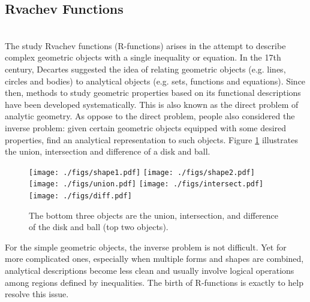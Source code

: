 \documentclass[11pt]{amsart}
\theoremstyle{definition}
\begin{document}
\subsection{Rvachev Functions}~\\
The study Rvachev functions (R-functions) arises in the attempt
to describe complex geometric objects with a single inequality or equation. In the
17th century, Decartes suggested the idea of relating geometric objects (e.g.
lines, circles and bodies) to analytical objects (e.g. sets, functions and
equations). Since then, methods to study geometric properties based on its
functional descriptions have been developed systematically. This is also known
as the direct problem of analytic geometry. As oppose to the direct problem,
people also considered the inverse problem: given certain geometric objects
equipped with some desired properties, find an analytical representation to
such objects. Figure \ref{DiskAndBall} illustrates the union, intersection and difference of a disk and ball. 

\begin{figure}
\texttt{[image: ./figs/shape1.pdf]}
\texttt{[image: ./figs/shape2.pdf]}
\\
\texttt{[image: ./figs/union.pdf]}
\texttt{[image: ./figs/intersect.pdf]}
\texttt{[image: ./figs/diff.pdf]}
\caption{The bottom three objects are the union, intersection, and difference of the disk and ball (top two objects).}
\label{DiskAndBall}
\end{figure}

For the simple geometric objects, the inverse problem is not
difficult. Yet for more complicated ones, especially when multiple forms
and shapes are combined, analytical descriptions become less clean and usually involve logical operations among regions defined by inequalities. The birth of R-functions is exactly to help resolve this issue.    
\end{document}
